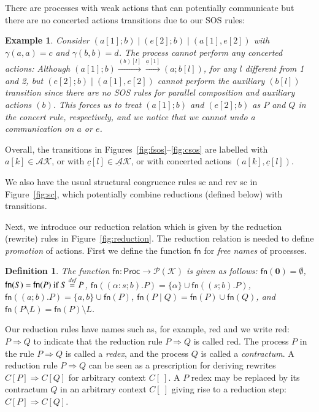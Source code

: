 \documentclass[review]{elsarticle}
\newcommand{\paral}{\; \vert \;}
\newcommand{\Proc}{\mathsf{Proc}}
\newcommand{\restrict}[1]{\!\setminus\!#1}
\newcommand{\mAK}{\mathcal{AK}}
\newcommand{\umAK}{\underline{\mathcal{A}}\mathcal{K}}
\newcommand{\Nil}{\mathbf{0}}
\newcommand{\Keys}{\mathcal{K}}
\newcommand{\bydef}{\stackrel{\emph{def}}{=}}
\newcommand{\rulename}[1]{\textsf{#1}}
\newtheorem{definition}{Definition}
\newtheorem{example}{Example}
\begin{document}
There are processes with weak actions that can potentially communicate but there are no concerted actions 
transitions due to our SOS rules:

\begin{example}\label{ex:examp3}
{\rm Consider $(a[1];b)\paral (e[2];b)\paral (a[1],e[2])$ with $\gamma(a,a)=c$ and $\gamma(b,b)=d$.
The process cannot perform any concerted actions: Although $(a[1];b)  \xrightarrow{(b)[l]} 
\xrightarrow{\underline{a}[1]} (a;b[l])$, for any $l$ different from 1 and 2, but
$(e[2];b)\paral (a[1],e[2])$  cannot perform the auxiliary $(b[l])$
transition since there are no SOS rules for parallel composition and auxiliary actions $(b)$. This forces us
to treat $(a[1];b)$ and $ (e[2];b)$ as $P$ and $Q$ in the \rulename{concert} rule, respectively, and we notice that
we cannot undo a communication on $a$ or $e$.}
\end{example}

Overall, the transitions in Figures~\ref{fig:fsos}--\ref{fig:csos} are labelled with $a[k] \in \mAK$, or with 
$\underline{c}[l] \in \umAK$, or with concerted actions $(a[k], \underline{c}[l])$.

We also have the usual structural congruence rules 
sc and rev sc in Figure~\ref{fig:sc}, 
which potentially combine reductions (defined below) with transitions.

Next, we introduce our reduction relation which is given by the reduction (rewrite) rules 
in Figure~\ref{fig:reduction}. The reduction relation is needed to define {\em promotion} 
of actions. First we define the function $\mathsf{fn}$ for {\em free names} of processes.

\begin{definition} \normalfont 
The function $\mathsf{fn}: \Proc \rightarrow \mathcal{P}(\Keys)$ is given as follows: 
$\mathsf{fn}(\Nil) = \emptyset$,
$\mathsf{fn}(S)=\mathsf{fn}(P) \text{ if }  S\bydef P$, $\mathsf{fn}((\alpha : s;b).P)=\{\alpha\} \cup 
\mathsf{fn}((s;b).P)$, $\mathsf{fn}((a;b).P)=\{a,b\} \cup \mathsf{fn}(P) $, $\mathsf{fn}(P\paral Q)=\mathsf{fn}(P) \cup \mathsf{fn}(Q)$, and $\mathsf{fn}(P \restrict L)=\mathsf{fn}(P) \restrict L$.
\end{definition}

\noindent
Our reduction rules have names such as, for example, \rulename{red} and we write 
\rulename{red}: $P \Rightarrow Q$
to indicate that the reduction rule $P \Rightarrow Q$ is called \rulename{red}. 
The process $P$ in the rule
$P\Rightarrow Q$ is called a \emph{redex}, and the process $Q$ is called a \emph{contractum}. 
A reduction rule $P\Rightarrow Q$ can be seen as a prescription 
for deriving rewrites $C[P] \Rightarrow C[Q]$ for arbitrary context $C[\ ]$. 
A $P$ redex may be replaced by its contractum $Q$ in an arbitrary context 
$C[\ ]$ giving rise to a reduction step: $C[P] \Rightarrow C[Q]$.
\end{document}
